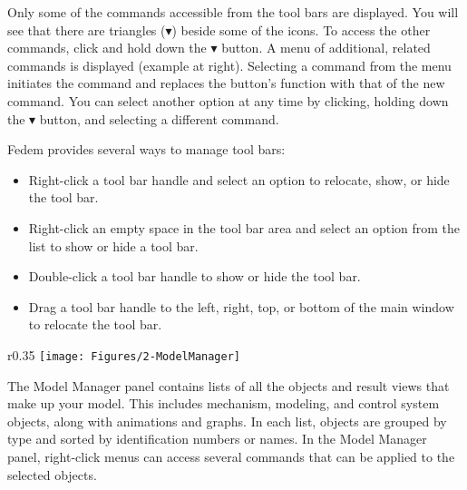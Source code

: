 Only some of the commands accessible from the tool \newline bars are displayed.
You will see that there are triangles \newline ($\blacktriangledown$)
beside some of the icons. To access the other \newline commands,
click and hold down the $\blacktriangledown$ button.
A menu of additional, related commands is displayed (example at right).
Selecting a command from the menu initiates the command and replaces the
button’s function with that of the new command. You can select another
option at any time by clicking, holding down the $\blacktriangledown$ button,
and selecting a different command.

\clearpage
Fedem provides several ways to manage tool bars:

\begin{itemize}
\item Right-click a tool bar handle and select an option
  to relocate, show, or hide the tool bar.
\item Right-click an empty space in the tool bar area and select
  an option from the list to show or hide a tool bar.
\item Double-click a tool bar handle to show or hide the tool bar.
\item Drag a tool bar handle to the left, right, top, or bottom of
  the main window to relocate the tool bar.
\end{itemize}



\begin{wrapfigure}[16]{r}{0.35\textwidth} \vskip-5mm
  \texttt{[image: Figures/2-ModelManager]}
\end{wrapfigure}

The Model Manager panel contains lists of all the objects and result views
that make up your model. This includes mechanism, modeling, and control
system objects, along with animations and graphs. In each list,
objects are grouped by type and sorted by identification numbers or names.
In the Model Manager panel, right-click menus can access several
commands that can be applied to the selected objects.


